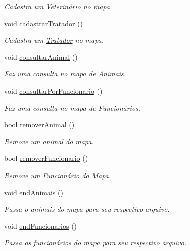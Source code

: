 \begin{DoxyCompactItemize}
\begin{DoxyCompactList}\small\item\em Cadastra um Veterinário no mapa. \end{DoxyCompactList}\item 
void \hyperlink{classPetFera_a3f19de637207b79b21af8668d864cea2}{cadastrar\+Tratador} ()
\begin{DoxyCompactList}\small\item\em Cadastra um \hyperlink{classTratador}{Tratador} no mapa. \end{DoxyCompactList}\item 
void \hyperlink{classPetFera_af8534e9ad0f23cec2766845567153923}{consultar\+Animal} ()
\begin{DoxyCompactList}\small\item\em Faz uma consulta no mapa de Animais. \end{DoxyCompactList}\item 
void \hyperlink{classPetFera_ae6f4463c6d4e0b5ca30ced88240cb6ec}{consultar\+Por\+Funcionario} ()
\begin{DoxyCompactList}\small\item\em Faz uma consulta no mapa de Funcionários. \end{DoxyCompactList}\item 
bool \hyperlink{classPetFera_a15cf97fce272f94a4dd27bf18fed06b5}{remover\+Animal} ()
\begin{DoxyCompactList}\small\item\em Remove um animal do mapa. \end{DoxyCompactList}\item 
bool \hyperlink{classPetFera_a847ce743f73cf9d16958a635b49e6e21}{remover\+Funcionario} ()
\begin{DoxyCompactList}\small\item\em Remove um Funcionário do Mapa. \end{DoxyCompactList}\item 
void \hyperlink{classPetFera_a49accf5dea36c98ba201db971ea17474}{end\+Animais} ()
\begin{DoxyCompactList}\small\item\em Passa o animais do mapa para seu respectivo arquivo. \end{DoxyCompactList}\item 
void \hyperlink{classPetFera_ac0cd93b390e788bb0af4fec1a2fa64da}{end\+Funcionarios} ()
\begin{DoxyCompactList}\small\item\em Passa os funcionários do mapa para seu respectivo arquivo. \end{DoxyCompactList}\item 

\end{DoxyCompactItemize}
